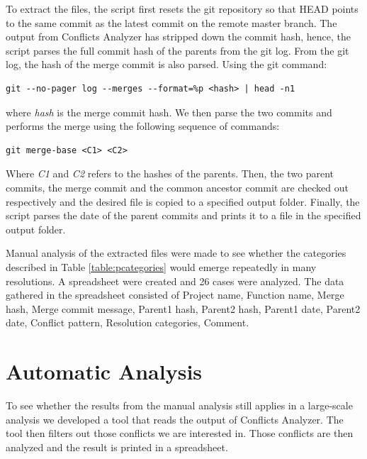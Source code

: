 To extract the files, the script first resets the git repository so that HEAD points to the same commit as the latest commit on the remote master branch. The output from Conflicts Analyzer has stripped down the commit hash, hence, the script parses the full commit hash of the parents from the git log. From the git log, the hash of the merge commit is also parsed. Using the git command:
\lstset{language=Bash}
\begin{lstlisting}[frame=single]
git --no-pager log --merges --format=%p <hash> | head -n1
\end{lstlisting}
where \textit{hash} is the merge commit hash. We then parse the two commits and performs the merge using the following sequence of commands:\\
\lstset{language=Bash,numbers=left,xleftmargin=2em,frame=single,framexleftmargin=1.5em}
\begin{lstlisting}[frame=single]
git merge-base <C1> <C2>
\end{lstlisting}
Where \textit{C1} and \textit{C2} refers to the hashes of the parents.  Then, the two parent commits, the merge commit and the common ancestor commit  are checked out respectively and the desired file is copied to a specified output folder. Finally, the script parses the date of the parent commits and prints it to a file in the specified output folder.

Manual analysis of the extracted files were made to see whether the categories described in Table \ref{table:pcategories} would emerge repeatedly in many resolutions. A spreadsheet were created and 26 cases were analyzed. The data gathered in the spreadsheet consisted of Project name, Function name, Merge hash, Merge commit message, Parent1 hash, Parent2 hash, Parent1 date, Parent2 date, Conflict pattern, Resolution categories, Comment.

\section{Automatic Analysis}
To see whether the results from the manual analysis still applies in a large-scale analysis we developed a tool that reads the output of Conflicts Analyzer. The tool then filters out those conflicts we are interested in. Those conflicts are then analyzed and the result is printed in a spreadsheet.

